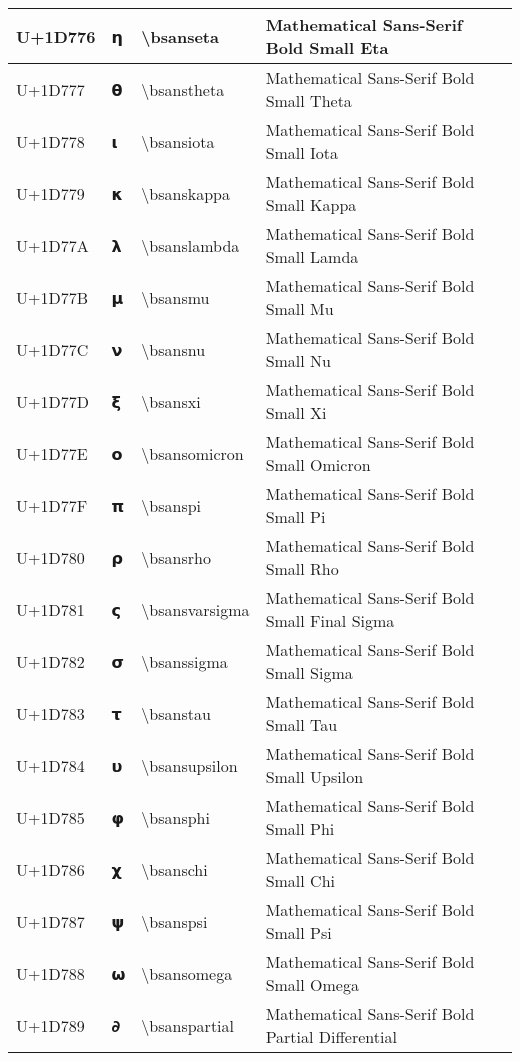 \begin{table}[h]
\begin{tabulary}{\linewidth}{|L|L|L|L|}
\hline
U+1D776 & 𝝶 & {\textbackslash}bsanseta & Mathematical Sans-Serif Bold Small Eta \\
\hline
U+1D777 & 𝝷 & {\textbackslash}bsanstheta & Mathematical Sans-Serif Bold Small Theta \\
\hline
U+1D778 & 𝝸 & {\textbackslash}bsansiota & Mathematical Sans-Serif Bold Small Iota \\
\hline
U+1D779 & 𝝹 & {\textbackslash}bsanskappa & Mathematical Sans-Serif Bold Small Kappa \\
\hline
U+1D77A & 𝝺 & {\textbackslash}bsanslambda & Mathematical Sans-Serif Bold Small Lamda \\
\hline
U+1D77B & 𝝻 & {\textbackslash}bsansmu & Mathematical Sans-Serif Bold Small Mu \\
\hline
U+1D77C & 𝝼 & {\textbackslash}bsansnu & Mathematical Sans-Serif Bold Small Nu \\
\hline
U+1D77D & 𝝽 & {\textbackslash}bsansxi & Mathematical Sans-Serif Bold Small Xi \\
\hline
U+1D77E & 𝝾 & {\textbackslash}bsansomicron & Mathematical Sans-Serif Bold Small Omicron \\
\hline
U+1D77F & 𝝿 & {\textbackslash}bsanspi & Mathematical Sans-Serif Bold Small Pi \\
\hline
U+1D780 & 𝞀 & {\textbackslash}bsansrho & Mathematical Sans-Serif Bold Small Rho \\
\hline
U+1D781 & 𝞁 & {\textbackslash}bsansvarsigma & Mathematical Sans-Serif Bold Small Final Sigma \\
\hline
U+1D782 & 𝞂 & {\textbackslash}bsanssigma & Mathematical Sans-Serif Bold Small Sigma \\
\hline
U+1D783 & 𝞃 & {\textbackslash}bsanstau & Mathematical Sans-Serif Bold Small Tau \\
\hline
U+1D784 & 𝞄 & {\textbackslash}bsansupsilon & Mathematical Sans-Serif Bold Small Upsilon \\
\hline
U+1D785 & 𝞅 & {\textbackslash}bsansphi & Mathematical Sans-Serif Bold Small Phi \\
\hline
U+1D786 & 𝞆 & {\textbackslash}bsanschi & Mathematical Sans-Serif Bold Small Chi \\
\hline
U+1D787 & 𝞇 & {\textbackslash}bsanspsi & Mathematical Sans-Serif Bold Small Psi \\
\hline
U+1D788 & 𝞈 & {\textbackslash}bsansomega & Mathematical Sans-Serif Bold Small Omega \\
\hline
U+1D789 & 𝞉 & {\textbackslash}bsanspartial & Mathematical Sans-Serif Bold Partial Differential \\

\end{tabulary}
\end{table}
